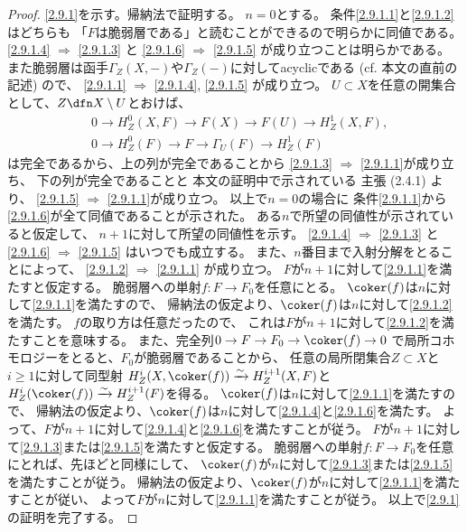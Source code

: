 \documentclass[uplatex,dvipdfmx]{jsarticle}
\begin{document}
\begin{proof}
  \ref{2.9.1}を示す。帰納法で証明する。
  \(n=0\)とする。
  条件\ref{2.9.1.1}と\ref{2.9.1.2}はどちらも
  「\(F\)は脆弱層である」と読むことができるので明らかに同値である。
  \ref{2.9.1.4} \(\Rightarrow\) \ref{2.9.1.3} と
  \ref{2.9.1.6} \(\Rightarrow\) \ref{2.9.1.5} が成り立つことは明らかである。
  また脆弱層は函手\(\Gamma_Z(X,-)\)や\(\Gamma_Z(-)\)に対してacyclicである
  (cf. 本文\cite[Proposition 2.4.10]{kashiwara2002sheaves}の直前の記述) ので、
  \ref{2.9.1.1} \(\Rightarrow\) \ref{2.9.1.4}, \ref{2.9.1.5} が成り立つ。
  \(U\subset X\)を任意の開集合として、\(Z\dfn X\setminus U\)とおけば、
  \begin{align*}
    &0 \to H^0_Z(X,F) \to F(X) \to F(U) \to H^1_Z(X,F), \\
    &0 \to H^0_Z(F) \to F \to \Gamma_U(F) \to H^1_Z(F)
  \end{align*}
  は完全であるから、上の列が完全であることから
  \ref{2.9.1.3} \(\Rightarrow\) \ref{2.9.1.1}が成り立ち、
  下の列が完全であることと
  本文\cite[Proposition 2.4.10]{kashiwara2002sheaves}の証明中で示されている
  主張 (2.4.1) より、
  \ref{2.9.1.5} \(\Rightarrow\) \ref{2.9.1.1}が成り立つ。
  以上で\(n=0\)の場合に
  条件\ref{2.9.1.1}から\ref{2.9.1.6}が全て同値であることが示された。
  ある\(n\)で所望の同値性が示されていると仮定して、
  \(n+1\)に対して所望の同値性を示す。
  \ref{2.9.1.4} \(\Rightarrow\) \ref{2.9.1.3} と
  \ref{2.9.1.6} \(\Rightarrow\) \ref{2.9.1.5} はいつでも成立する。
  また、\(n\)番目まで入射分解をとることによって、
  \ref{2.9.1.2} \(\Rightarrow\) \ref{2.9.1.1} が成り立つ。
  \(F\)が\(n+1\)に対して\ref{2.9.1.1}を満たすと仮定する。
  脆弱層への単射\(f:F\to F_0\)を任意にとる。
  \(\coker(f)\)は\(n\)に対して\ref{2.9.1.1}を満たすので、
  帰納法の仮定より、\(\coker(f)\)は\(n\)に対して\ref{2.9.1.2}を満たす。
  \(f\)の取り方は任意だったので、
  これは\(F\)が\(n+1\)に対して\ref{2.9.1.2}を満たすことを意味する。
  また、完全列\(0\to F\to F_0\to \coker(f) \to 0\)
  で局所コホモロジーをとると、\(F_0\)が脆弱層であることから、
  任意の局所閉集合\(Z\subset X\)と\(i\geq 1\)に対して同型射
  \(H^i_Z(X,\coker(f)) \xrightarrow{\sim} H^{i+1}_Z(X,F)\)と
  \(H^i_Z(\coker(f)) \xrightarrow{\sim} H^{i+1}_Z(F)\)を得る。
  \(\coker(f)\)は\(n\)に対して\ref{2.9.1.1}を満たすので、
  帰納法の仮定より、\(\coker(f)\)は\(n\)に対して\ref{2.9.1.4}と\ref{2.9.1.6}を満たす。
  よって、\(F\)が\(n+1\)に対して\ref{2.9.1.4}と\ref{2.9.1.6}を満たすことが従う。
  \(F\)が\(n+1\)に対して\ref{2.9.1.3}または\ref{2.9.1.5}を満たすと仮定する。
  脆弱層への単射\(f:F\to F_0\)を任意にとれば、先ほどと同様にして、
  \(\coker(f)\)が\(n\)に対して\ref{2.9.1.3}または\ref{2.9.1.5}を満たすことが従う。
  帰納法の仮定より、\(\coker(f)\)が\(n\)に対して\ref{2.9.1.1}を満たすことが従い、
  よって\(F\)が\(n\)に対して\ref{2.9.1.1}を満たすことが従う。
  以上で\ref{2.9.1}の証明を完了する。


\end{proof}
\end{document}
